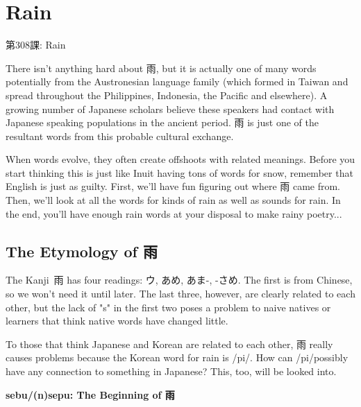     
\chapter{Rain}

\begin{center}
\begin{Large}
第308課: Rain  
\end{Large}
\end{center}
 
\par{ There isn't anything hard about 雨, but it is actually one of many words potentially from the Austronesian language family (which formed in Taiwan and spread throughout the Philippines, Indonesia, the Pacific and elsewhere). A growing number of Japanese scholars believe these speakers had contact with Japanese speaking populations in the ancient period. 雨 is just one of the resultant words from this probable cultural exchange. }

\par{ When words evolve, they often create offshoots with related meanings. Before you start thinking this is just like Inuit having tons of words for snow, remember that English is just as guilty. First, we'll have fun figuring out where 雨 came from. Then, we'll look at all the words for kinds of rain as well as sounds for rain. In the end, you'll have enough rain words at your disposal to make rainy poetry\dothyp{}\dothyp{}\dothyp{} }
      
\section{The Etymology of 雨}
 
\par{ The Kanji 雨 has four readings: ウ, あめ, あま-, -さめ. The first is from Chinese, so we won't need it until later. The last three, however, are clearly related to each other, but the lack of "s" in the first two poses a problem to naive natives or learners that think native words have changed little. }

\par{ To those that think Japanese and Korean are related to each other, 雨 really causes problems because the Korean word for rain is \slash pi\slash . How can \slash pi\slash  possibly have any connection to something in Japanese? This, too, will be looked into. }

\begin{center}
\textbf{sebu\slash (n)sepu: The Beginning of 雨 } 
\end{center}

